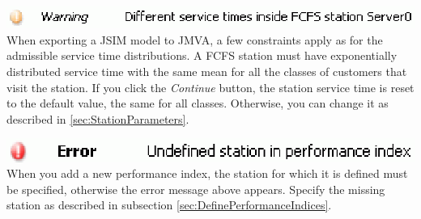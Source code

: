 \begin{itemize*}
\item \includegraphics[scale=.5]{img/jsim/13.eps}\\
When exporting a JSIM model to JMVA, a few constraints apply as for the admissible service time distributions. A FCFS station must have exponentially distributed service time with the same mean for all the classes of customers that visit the station. If you click the \emph{Continue} button, the station service time is
reset to the default value, the same for all classes. Otherwise, you can change it as described in \autoref{sec:StationParameters}.
\item \includegraphics[scale=.5]{img/jsim/14.eps}\\
When you add a new performance index, the station for which it is defined must be specified, otherwise the error message above appears. Specify the missing station as described in subsection  \autoref{sec:DefinePerformanceIndices}.
\end{itemize*}

